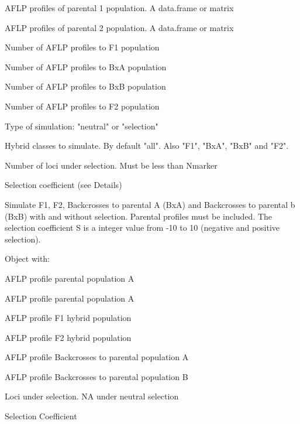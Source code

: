 \documentclass[letterpaper]{book}
\begin{document}
\begin{Arguments}
\begin{ldescription}

\item[\code{pa}] 
AFLP profiles of parental 1 population. A data.frame or matrix

\item[\code{pb}] 
AFLP profiles of parental 2 population. A data.frame or matrix

\item[\code{Nf1}] 
Number of AFLP profiles to F1 population

\item[\code{Nbxa}] 
Number of AFLP profiles to BxA population

\item[\code{Nbxb}] 
Number of AFLP profiles to BxB population

\item[\code{Nf2}] 
Number of AFLP profiles to F2 population

\item[\code{type}] 
Type of simulation: "neutral" or "selection"

\item[\code{hybrid}] 
Hybrid classes to simulate. By default "all". Also "F1", "BxA", "BxB" and "F2".


\item[\code{Nsel}] 
Number of loci under selection. Must be less than Nmarker

\item[\code{S}] 
Selection coefficient (see Details)

\end{ldescription}
\end{Arguments}
%
\begin{Details}\relax
Simulate F1, F2, Backcrosses to parental A (BxA) and Backcrosses to parental b (BxB) with and without selection. Parental profiles must be included. The selection coefficient S is a integer value from -10 to 10 (negative and positive selection). 
\end{Details}
%
\begin{Value}
Object  with:
\begin{ldescription}
\item[\code{PA }] AFLP profile parental population A
\item[\code{PB }] AFLP profile parental population A
\item[\code{F1}] AFLP profile F1 hybrid population
\item[\code{F2}] AFLP profile F2 hybrid population
\item[\code{BxA}] AFLP profile Backcrosses to parental population A
\item[\code{BxB}] AFLP profile Backcrosses to parental population B
\item[\code{Nsel}] Loci under selection. NA under neutral selection
\item[\code{S}] Selection Coefficient
\end{ldescription}
\end{Value}
\end{document}
